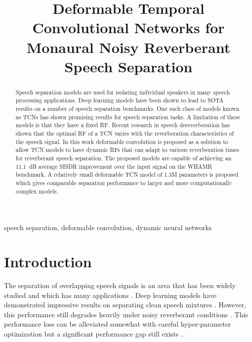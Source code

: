 \documentclass{article}
\begin{document}
\title{Deformable Temporal Convolutional Networks for Monaural Noisy Reverberant Speech Separation
}



\address{\textit{Department of Computer Science}, 
\textit{{The} University of Sheffield}, Sheffield, United Kingdom \\
\{jwravenscroft1, s.goetze, t.hain\}@sheffield.ac.uk\vspace*{-0.2cm}}





\maketitle

\begin{abstract}
Speech separation models are used for isolating individual speakers in many speech processing applications. Deep learning models have been shown to lead to \ac{SOTA} results on a number of speech separation benchmarks. One such class of models known as \acp{TCN} has shown promising results for speech separation tasks. A limitation of these models is that they have a fixed \ac{RF}. Recent research in speech dereverberation has shown that the optimal \ac{RF} of a \ac{TCN} varies with the reverberation characteristics of the speech signal. In this work deformable convolution is proposed as a solution to allow \ac{TCN} models to have dynamic \acp{RF} that can adapt to various reverberation times for reverberant speech separation. The proposed models are capable of achieving an 11.1~dB average \ac{SISDR} improvement over the input signal on the WHAMR benchmark. A relatively small deformable \ac{TCN} model of 1.3M parameters is proposed which gives comparable separation performance to larger and more computationally complex models.
\end{abstract}

\begin{keywords}
speech separation, deformable convolution, dynamic neural networks
\end{keywords}

\section{Introduction}
The separation of overlapping speech signals is an area that has been widely studied and which has many applications \cite{Benesty_Source_Separation_2000,Moritz13,FFASRHaebUmbach,ShiHain21}.
Deep learning models have demonstrated impressive results on separating clean speech mixtures \cite{convtasnet,sepformer}. However, this performance still degrades heavily under noisy reverberant conditions \cite{WHAMR}. This performance loss can be alleviated somewhat with careful hyper-parameter optimization but a significant performance gap still exists \cite{IWAENCbestpaper}.
\end{document}
